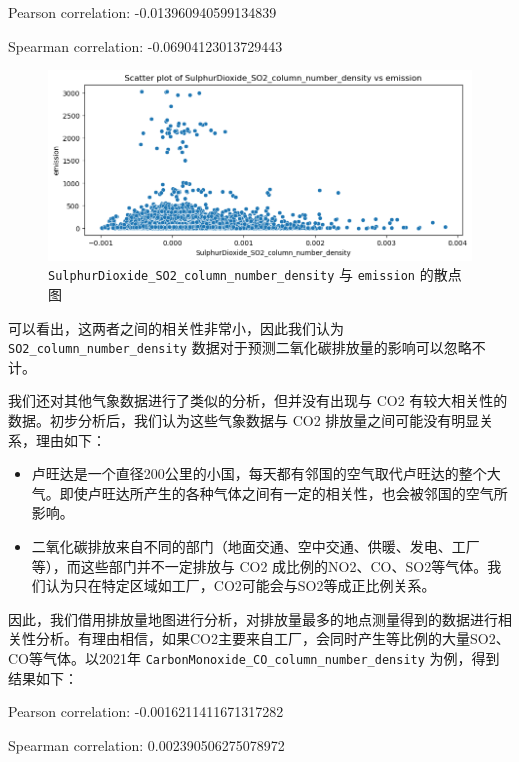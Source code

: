 \documentclass{ctexart}
\begin{document}
\begin{center}
      Pearson correlation: -0.013960940599134839

      Spearman correlation: -0.06904123013729443
\end{center}


\begin{figure}[H]
      \centering
      \includegraphics[width=1\textwidth]{output1.png}
      \caption{\texttt{SulphurDioxide\_SO2\_column\_number\_density} 与 \texttt{emission} 的散点图}
      \label{fig:1}
\end{figure}

可以看出，这两者之间的相关性非常小，因此我们认为 \texttt{SO2\_column\_number\_density} 数据对于预测二氧化碳排放量的影响可以忽略不计。

我们还对其他气象数据进行了类似的分析，但并没有出现与 CO2 有较大相关性的数据。初步分析后，我们认为这些气象数据与 CO2 排放量之间可能没有明显关系，理由如下：

\begin{itemize}
      \item 卢旺达是一个直径200公里的小国，每天都有邻国的空气取代卢旺达的整个大气。即使卢旺达所产生的各种气体之间有一定的相关性，也会被邻国的空气所影响。
      \item 二氧化碳排放来自不同的部门（地面交通、空中交通、供暖、发电、工厂等），而这些部门并不一定排放与 CO2 成比例的NO2、CO、SO2等气体。我们认为只在特定区域如工厂，CO2可能会与SO2等成正比例关系。
\end{itemize}

因此，我们借用排放量地图进行分析，对排放量最多的地点测量得到的数据进行相关性分析。有理由相信，如果CO2主要来自工厂，会同时产生等比例的大量SO2、CO等气体。以2021年 \texttt{CarbonMonoxide\_CO\_column\_number\_density} 为例，得到结果如下：

\begin{center}
      Pearson correlation: -0.0016211411671317282

      Spearman correlation: 0.002390506275078972
\end{center}
\end{document}
